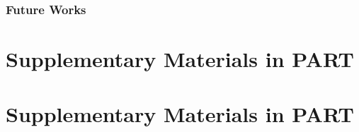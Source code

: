 \documentclass[12pt, letterpaper]{report}   %
\begin{document}
\subsection{Future Works}
\label{sec:future-psRB}


% 



\cleardoublepage


\nocite{tikzDevice,plotly,reshape,Rcomputing,Florida2000}



\chapter*{}

\begin{appendices}
\chapter{Supplementary Materials in {PART }}
\label{apdx:adapt}


\chapter{Supplementary Materials in {PART }}
\label{apdx:reachability}


\end{appendices}
\end{document}
